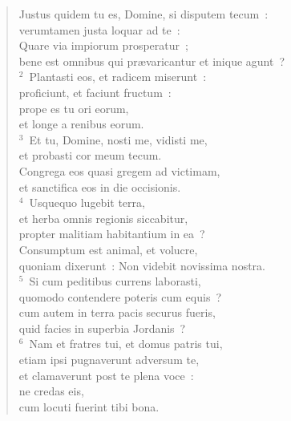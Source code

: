 \begin{flushleft}\begin{verse}\vspace{-19pt}\hspace{6pt}Justus quidem tu es, Domine, si disputem tecum~:\\\hspace{6pt} verumtamen justa loquar ad te~:\\ Quare via impiorum prosperatur~;\\ bene est omnibus qui pr\ae varicantur et inique agunt~?\\
${}^{2}$~Plantasti eos, et radicem miserunt~:\\ proficiunt, et faciunt fructum~:\\ prope es tu ori eorum,\\ et longe a renibus eorum.\\
${}^{3}$~Et tu, Domine, nosti me, vidisti me,\\ et probasti cor meum tecum.\\ Congrega eos quasi gregem ad victimam,\\ et sanctifica eos in die occisionis.\\
${}^{4}$~Usquequo lugebit terra,\\ et herba omnis regionis siccabitur,\\ propter malitiam habitantium in ea~?\\ Consumptum est animal, et volucre,\\ quoniam dixerunt~: Non videbit novissima nostra.\\
${}^{5}$~Si cum peditibus currens laborasti,\\ quomodo contendere poteris cum equis~?\\ cum autem in terra pacis securus fueris,\\ quid facies in superbia Jordanis~?\\
${}^{6}$~Nam et fratres tui, et domus patris tui,\\ etiam ipsi pugnaverunt adversum te,\\ et clamaverunt post te plena voce~:\\ ne credas eis,\\ cum locuti fuerint tibi bona.\end{verse}\end{flushleft}


